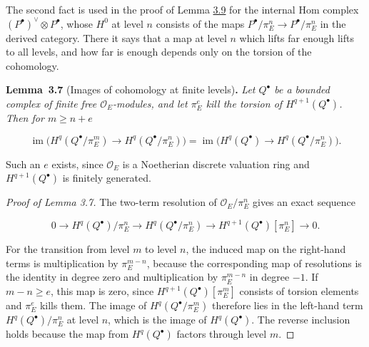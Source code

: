 \documentclass[11pt]{article}
\newenvironment{bpstatement}[2]{\par\addvspace{0.6\baselineskip}\noindent\textbf{#1}#2\textbf{.}\enspace\ignorespaces}
  {\par\addvspace{0.4\baselineskip}}
\newenvironment{bpstatementit}[2]{\begin{bpstatement}{#1}{#2}\itshape\ignorespaces}{\end{bpstatement}}
\begin{document}
\label{bp213}%
The second fact is used in the proof of Lemma \hyperref[bp221]{3.9} for the internal Hom complex \((P^\bullet)^\vee\otimes P^\bullet\), whose \(H^0\) at level \(n\) consists of the maps \(P^\bullet/\pi_E^n\to P^\bullet/\pi_E^n\) in the derived category. There it says that a map at level \(n\) which lifts far enough lifts to all levels, and how far is enough depends only on the torsion of the cohomology.

\label{bp214}%
\begin{bpstatementit}{Lemma~3.7}{ (Images of cohomology at finite levels)}
Let \(Q^\bullet\) be a bounded complex of finite free \(\mathcal O_E\)-modules, and let \(\pi_E^e\) kill the torsion of \(H^{q+1}(Q^\bullet)\). Then for \(m\ge n+e\)

\[
\operatorname{im}\bigl(H^q(Q^\bullet/\pi_E^m)\to
H^q(Q^\bullet/\pi_E^n)\bigr)
=\operatorname{im}\bigl(H^q(Q^\bullet)\to
H^q(Q^\bullet/\pi_E^n)\bigr).
\]
\end{bpstatementit}

\label{bp215}%
Such an \(e\) exists, since \(\mathcal O_E\) is a Noetherian discrete valuation ring and \(H^{q+1}(Q^\bullet)\) is finitely generated.

\begin{proof}[{Proof of Lemma 3.7}]\label{bp216}%
The two-term resolution of \(\mathcal O_E/\pi_E^n\) gives an exact sequence

\[
0\to H^q(Q^\bullet)/\pi_E^n\to H^q(Q^\bullet/\pi_E^n)
\to H^{q+1}(Q^\bullet)[\pi_E^n]\to0.
\]

For the transition from level \(m\) to level \(n\), the induced map on the right-hand terms is multiplication by \(\pi_E^{m-n}\), because the corresponding map of resolutions is the identity in degree zero and multiplication by \(\pi_E^{m-n}\) in degree \(-1\). If \(m-n\ge e\), this map is zero, since \(H^{q+1}(Q^\bullet)[\pi_E^m]\) consists of torsion elements and \(\pi_E^e\) kills them. The image of \(H^q(Q^\bullet/\pi_E^m)\) therefore lies in the left-hand term \(H^q(Q^\bullet)/\pi_E^n\) at level \(n\), which is the image of \(H^q(Q^\bullet)\). The reverse inclusion holds because the map from \(H^q(Q^\bullet)\) factors through level \(m\).
\end{proof}
\end{document}
